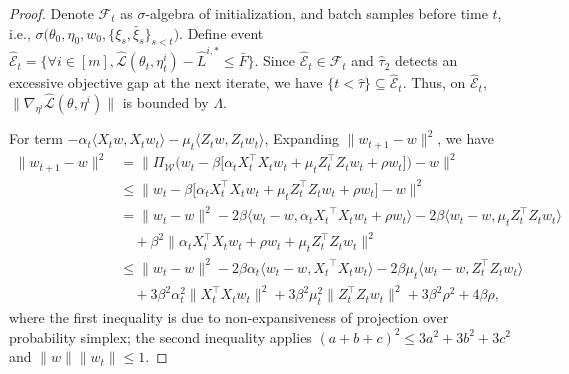 \documentclass[twoside]{article} %
\theoremstyle{plain}
\theoremstyle{definition}
\theoremstyle{remark}
\newcommand{\hL}{\hat{L}}
\newcommand{\fhL}{\hat{\mathcal{L}}}
\newcommand{\calhatE}{\mathcal{\hat{E}}}
\begin{document}
\begin{proof} 
Denote $\mathcal{F}_t$ as $\sigma$-algebra of initialization, and batch samples before time $t$, i.e., $\sigma\big(\theta_0, \eta_0, w_0, \{\xi_s,\bar{\xi}_s\}_{s<t} \big)$. Define event $\calhatE_t = \{\forall i\in[m], \fhL(\theta_t,\eta_t^i) - \hL^{i,*}\leq \bar{F} \}$. Since $\calhatE_t \in \mathcal{F}_t$ and $\hat{\tau}_2$ detects an excessive objective gap at the next iterate, we have $\{t<\hat{\tau}\} \subseteq \calhatE_t$. Thus, on $\calhatE_t$, $\|\nabla_{\eta^i}\fhL(\theta,\eta^i)\|$ is bounded by $\Lambda$.

For term ${-\alpha_t \langle {X}_tw, X_tw_t \rangle-\mu_t\langle Z_tw,Z_tw_t\rangle}$, 
Expanding $\|w_{t+1}-w\|^2$, we have
\begin{align}
    \|{w}_{t+1} - {w} \|^2&= \| \Pi_{\mathcal{W}} \big({w}_t - \beta \big[{\alpha_t{X}_t^{\top}X_t{w}_t}+
   \mu_t{{Z}_t^{\top}Z_t{w}_t}+\rho {w}_t \big]\big) - {w} \|^2\nonumber\\
    &\leq \|{w}_t - \beta \big[{\alpha_t{X}_t^{\top}X_t{w}_t}+\mu_t{{Z}_t^{\top}Z_t{w}_t}+\rho {w}_t \big]- {w} \|^2 \nonumber\\
    &= \|{w}_t - {w} \|^2 -2\beta \langle {w}_t-{w}, {\alpha_t{X_t}^{\top}X_t{w}_t}+\rho {w}_t \rangle -2\beta\langle w_t-w,\mu_t{{Z}_t^{\top}Z_t{w}_t} \rangle \nonumber\\
    &\quad+ \beta^2\|\alpha_t{{X}_t^{\top}X_t{w}_t}+\rho {w}_t + \mu_t{{Z}_t^{\top}Z_t{w}_t} \|^2\nonumber \\
    &\leq \|{w}_t - {w} \|^2 -2\beta{\alpha_t} \langle {w}_t-{w}, {{X_t}^{\top}X_t{w}_t} \rangle -2\beta\mu_t\langle w_t-w,{{Z}_t^{\top}Z_t{w}_t} \rangle \nonumber\\
    &\quad + 3\beta^2\alpha_t^2 \|{{X}_t^{\top} X_t w_t}\|^2+{3\beta^2\mu_t^2}\|{Z}_t^{\top}Z_tw_t\|^2+3\beta^2 \rho^2 + {4}\beta\rho,
    \label{eq: coro MGDA from 1st principle}
\end{align}
where the first inequality is due to non-expansiveness of projection over probability simplex; the second inequality applies $(a+b+c)^2\leq 3a^2+3b^2+3c^2$ and $\|w\|\|w_t\|\leq 1$.


\end{proof}
\end{document}
